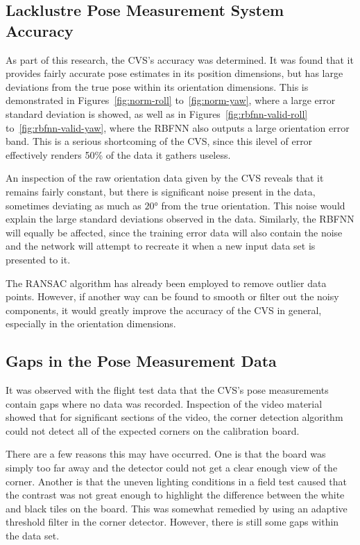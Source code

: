 \subsection{Lacklustre Pose Measurement System Accuracy}

As part of this research, the CVS's accuracy was determined. It was found that it provides fairly accurate pose estimates in its position dimensions, but has large deviations from the true pose within its orientation dimensions. This is demonstrated in Figures~\ref{fig:norm-roll} to~\ref{fig:norm-yaw}, where a large error standard deviation is showed, as well as in Figures~\ref{fig:rbfnn-valid-roll} to~\ref{fig:rbfnn-valid-yaw}, where the RBFNN also outputs a large orientation error band. This is a serious shortcoming of the CVS, since this ilevel of error effectively renders 50\% of the data it gathers useless. 

An inspection of the raw orientation data given by the CVS reveals that it remains fairly constant, but there is significant noise present in the data, sometimes deviating as much as $\ang{20}$ from the true orientation. This noise would explain the large standard deviations observed in the data. Similarly, the RBFNN will equally be affected, since the training error data will also contain the noise and the network will attempt to recreate it when a new input data set is presented to it. 

The RANSAC algorithm has already been employed to remove outlier data points. However, if another way can be found to smooth or filter out the noisy components, it would greatly improve the accuracy of the CVS in general, especially in the orientation dimensions. 

\subsection{Gaps in the Pose Measurement Data}

It was observed with the flight test data that the CVS's pose measurements contain gaps where no data was recorded. Inspection of the video material showed that for significant sections of the video, the corner detection algorithm could not detect all of the expected corners on the calibration board. 

There are a few reasons this may have occurred. One is that the board was simply too far away and the detector could not get a clear enough view of the corner. Another is that the uneven lighting conditions in a field test caused that the contrast was not great enough to highlight the difference between the white and black tiles on the board. This was somewhat remedied by using an adaptive threshold filter in the corner detector. However, there is still some gaps within the data set. 

